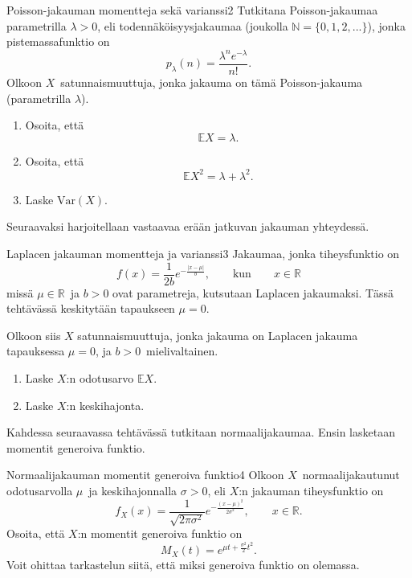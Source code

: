 \documentclass[11pt,a4paper]{amsart}
\newcommand{\N}{\mathbb{N}}
\newcommand{\R}{\mathbb{R}}
\newcommand{\E}{\mathbb{E}}
\newcommand{\1}{\mathbf{1}}
\begin{document}
\begin{Exercises}{Poisson-jakauman momentteja sekä varianssi}{2}
Tutkitana Poisson-jakaumaa parametrilla $\lambda>0$, eli todennäköisyysjakaumaa (joukolla $\N=\{0,1,2,...\}$), jonka pistemassafunktio on 
\[
p_\lambda(n)=\frac{\lambda^n e^{-\lambda}}{n!}.
\]
Olkoon $X$ satunnaismuuttuja, jonka jakauma on tämä Poisson-jakauma (parametrilla $\lambda$). 
\begin{enumerate}
\item Osoita, että 
\[
\E X=\lambda.
\]

\item Osoita, että 
\[
\E X^2=\lambda+\lambda^2.
\]

\item Laske $\mathrm{Var}(X)$. 

\end{enumerate}
\end{Exercises}

Seuraavaksi harjoitellaan vastaavaa erään jatkuvan jakauman yhteydessä.

\begin{Exercises}{Laplacen jakauman momentteja ja varianssi}{3}
Jakaumaa, jonka tiheysfunktio on 
\[
f(x)=\frac{1}{2b}e^{-\frac{|x-\mu|}{b}}, \qquad \text{kun} \qquad x\in \R
\]
missä $\mu\in \R$ ja $b>0$ ovat parametreja, kutsutaan Laplacen jakaumaksi. Tässä tehtävässä keskitytään tapaukseen $\mu=0$.

\medskip 

Olkoon siis $X$ satunnaismuuttuja, jonka jakauma on Laplacen jakauma tapauksessa $\mu=0$, ja $b>0$ mielivaltainen. 
\begin{enumerate}
\item Laske $X$:n odotusarvo $\E X$. 

\item Laske $X$:n keskihajonta.

\end{enumerate}
\end{Exercises}

Kahdessa seuraavassa tehtävässä tutkitaan normaalijakaumaa. Ensin lasketaan momentit generoiva funktio.

\begin{Exercises}{Normaalijakauman momentit generoiva funktio}{4}
Olkoon $X$ normaalijakautunut odotusarvolla $\mu$ ja keskihajonnalla $\sigma>0$, eli $X$:n jakauman tiheysfunktio on 
\[
f_X(x)=\frac{1}{\sqrt{2\pi \sigma^2}}e^{-\frac{(x-\mu)^2}{2\sigma^2}}, \qquad x\in \R.
\]
Osoita, että $X$:n momentit generoiva funktio on 
\[
M_X(t)=e^{\mu t+\frac{\sigma^2}{2}t^2}.
\]
Voit ohittaa tarkastelun siitä, että miksi generoiva funktio on olemassa. 


\end{Exercises}
\end{document}
